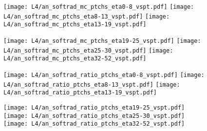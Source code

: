 \documentclass[landscape,10pt]{beamer} %
\begin{document}
{\newpage

\newpage

\begin{figure}[p]
\centering
  \texttt{[image: L4/an\_softrad\_mc\_ptchs\_eta0-8\_vspt.pdf]}
  \texttt{[image: L4/an\_softrad\_mc\_ptchs\_eta8-13\_vspt.pdf]}
  \texttt{[image: L4/an\_softrad\_mc\_ptchs\_eta13-19\_vspt.pdf]}
\end{figure}
\begin{figure}[p]
\centering
  \texttt{[image: L4/an\_softrad\_mc\_ptchs\_eta19-25\_vspt.pdf]}
  \texttt{[image: L4/an\_softrad\_mc\_ptchs\_eta25-30\_vspt.pdf]}
  \texttt{[image: L4/an\_softrad\_mc\_ptchs\_eta32-52\_vspt.pdf]}
\end{figure}

\newpage

\begin{figure}[p]
\centering
  \texttt{[image: L4/an\_softrad\_ratio\_ptchs\_eta0-8\_vspt.pdf]}
  \texttt{[image: L4/an\_softrad\_ratio\_ptchs\_eta8-13\_vspt.pdf]}
  \texttt{[image: L4/an\_softrad\_ratio\_ptchs\_eta13-19\_vspt.pdf]}
\end{figure}
\begin{figure}[p]
\centering
  \texttt{[image: L4/an\_softrad\_ratio\_ptchs\_eta19-25\_vspt.pdf]}
  \texttt{[image: L4/an\_softrad\_ratio\_ptchs\_eta25-30\_vspt.pdf]}
  \texttt{[image: L4/an\_softrad\_ratio\_ptchs\_eta32-52\_vspt.pdf]}
\end{figure}

\newpage

} %

\newpage
\end{document}
